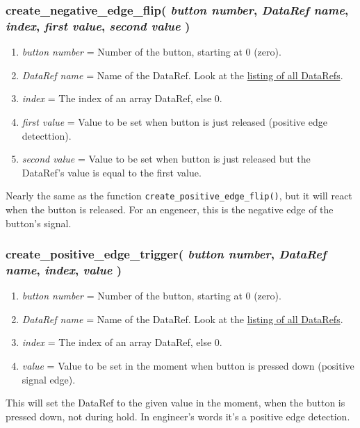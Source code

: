 \documentclass[11pt,parskip=half,a4paper]{scrartcl}
\begin{document}
\subsubsection{create\_negative\_edge\_flip( \emph{button number}, \emph{DataRef name}, \emph{index}, \emph{first value}, \emph{second value} )}

\begin{enumerate}
	\item \emph{button number} = Number of the button, starting at 0 (zero).
	\item \emph{DataRef name} = Name of the DataRef. Look at the \href{http://www.xsquawkbox.net/xpsdk/docs/DataRefs.html}{listing of all DataRefs}.
	\item \emph{index} = The index of an array DataRef, else 0.
	\item \emph{first value} = Value to be set when button is just released (positive edge detecttion).
	\item \emph{second value} = Value to be set when button is just released but the DataRef's value is equal to the first value.
\end{enumerate}

Nearly the same as the function \verb|create_positive_edge_flip()|, but it will react when the button is released. For an engeneer, this is the negative edge of the button's signal.

\subsubsection{create\_positive\_edge\_trigger( \emph{button number}, \emph{DataRef name}, \emph{index}, \emph{value} )}

\begin{enumerate}
	\item \emph{button number} = Number of the button, starting at 0 (zero).
	\item \emph{DataRef name} = Name of the DataRef. Look at the \href{http://www.xsquawkbox.net/xpsdk/docs/DataRefs.html}{listing of all DataRefs}.
	\item \emph{index} = The index of an array DataRef, else 0.
	\item \emph{value} = Value to be set in the moment when button is pressed down (positive signal edge).
\end{enumerate}

This will set the DataRef to the given value in the moment, when the button is pressed down, not during hold. In engineer's words it's a positive edge detection.
\end{document}
